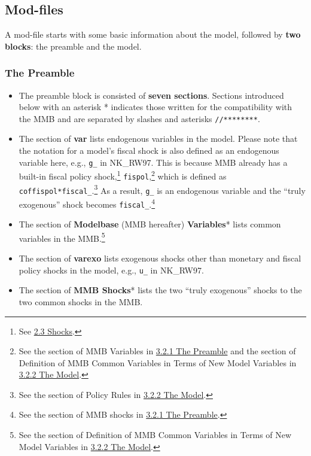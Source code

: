 \documentclass[10pt,a4paper]{article}
\begin{document}
\subsection{Mod-files}
\label{sec:Mod}
\bigskip

A mod-file starts with some basic information about the model, followed by \textbf{two blocks}: the preamble and the model.

\subsubsection{The Preamble}
\label{sec:Preamble}
\medskip

\begin{itemize}
\item The preamble block is consisted of \textbf{seven sections}. Sections introduced below with an asterisk * indicates those written for the compatibility with the MMB and are separated by slashes and asterisks \texttt{//********}.

\item The section of \textbf{var} lists endogenous variables in the model. Please note that the notation for a model's fiscal shock is also defined as an endogenous variable here, e.g., \texttt{g\_} in NK\_RW97. This is because MMB already has a built-in fiscal policy shock,\footnote{See \hyperref[sec:Shocks]{2.3 Shocks}.} \texttt{fispol},\footnote{See the section of MMB Variables in \hyperref[sec:Preamble]{3.2.1 The Preamble} and the section of Definition of MMB Common Variables in Terms of New Model Variables in \hyperref[sec:Model]{3.2.2 The Model}.} which is defined as \texttt{coffispol*fiscal\_}.\footnote{See the section of Policy Rules in \hyperref[sec:Model]{3.2.2 The Model}.} As a result, \texttt{g\_} is an endogenous variable and the “truly exogenous” shock becomes \texttt{fiscal\_}.\footnote{See the section of MMB shocks in \hyperref[sec:Preamble]{3.2.1 The Preamble}.}

\item The section of \textbf{Modelbase} (MMB hereafter) \textbf{Variables}* lists common variables in the MMB.\footnote{See the section of Definition of MMB Common Variables in Terms of New Model Variables in \hyperref[sec:Model]{3.2.2 The Model}.}

\item The section of \textbf{varexo} lists exogenous shocks other than monetary and fiscal policy shocks in the model, e.g., \texttt{u\_} in NK\_RW97.

\item The section of \textbf{MMB Shocks}* lists the two “truly exogenous” shocks to the two common shocks in the MMB.


\end{itemize}
\end{document}
